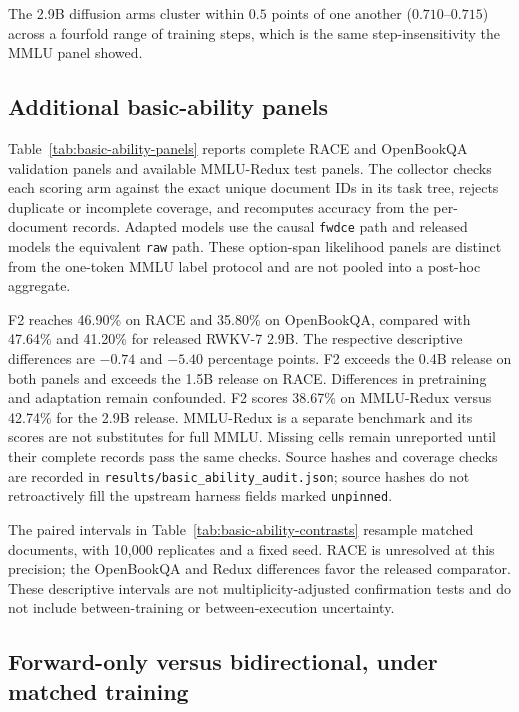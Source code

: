 The 2.9B diffusion arms cluster within $0.5$ points of one another
($0.710$--$0.715$) across a fourfold range of training steps, which is the same
step-insensitivity the MMLU panel showed.

\subsection{Additional basic-ability panels}
\label{m:basic}


Table~\ref{tab:basic-ability-panels} reports complete RACE and OpenBookQA validation panels and available MMLU-Redux test panels. The collector checks each scoring arm against the exact unique document IDs in its task tree, rejects duplicate or incomplete coverage, and recomputes accuracy from the per-document records. Adapted models use the causal \texttt{fwdce} path and released models the equivalent \texttt{raw} path. These option-span likelihood panels are distinct from the one-token MMLU label protocol and are not pooled into a post-hoc aggregate.

F2 reaches 46.90\% on RACE and 35.80\% on OpenBookQA, compared with 47.64\% and 41.20\% for released RWKV-7 2.9B. The respective descriptive differences are $-0.74$ and $-5.40$ percentage points. F2 exceeds the 0.4B release on both panels and exceeds the 1.5B release on RACE. Differences in pretraining and adaptation remain confounded. F2 scores 38.67\% on MMLU-Redux versus 42.74\% for the 2.9B release. MMLU-Redux is a separate benchmark and its scores are not substitutes for full MMLU. Missing cells remain unreported until their complete records pass the same checks. Source hashes and coverage checks are recorded in \texttt{results/basic\_ability\_audit.json}; source hashes do not retroactively fill the upstream harness fields marked \texttt{unpinned}.


The paired intervals in Table~\ref{tab:basic-ability-contrasts} resample matched documents, with 10,000 replicates and a fixed seed. RACE is unresolved at this precision; the OpenBookQA and Redux differences favor the released comparator. These descriptive intervals are not multiplicity-adjusted confirmation tests and do not include between-training or between-execution uncertainty.

\subsection{Forward-only versus bidirectional, under matched training}
\label{m:direction}

